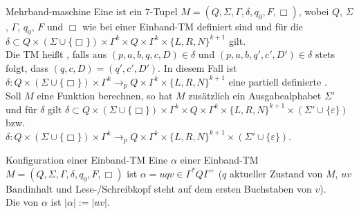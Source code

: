 \begin{Def}{Mehrband-maschine}
    Eine  ist ein $7$-Tupel
    $M = (Q, \Sigma, \Gamma, \delta, q_0, F, \Box)$, wobei
    $Q$, $\Sigma$, $\Gamma$, $q_0$, $F$ und $\Box$ wie bei einer Einband-TM definiert sind
    und für die \\
    $\delta \subset Q \times (\Sigma \cup \{\Box\}) \times \Gamma^k \times Q \times
    \Gamma^k \times \{L, R, N\}^{k+1}$ gilt.\\
    Die TM heißt , falls aus
    $(p, a, b, q, c, D) \in \delta$ und $(p, a, b, q', c', D') \in \delta$ stets folgt, dass
    $(q, c, D) = (q', c', D')$.
    In diesem Fall ist
    $\delta\colon Q \times (\Sigma \cup \{\Box\}) \times \Gamma^k \rightarrow_p Q \times
    \Gamma^k \times \{L, R, N\}^{k+1}$
    eine partiell definierte .\\
    Soll $M$ eine Funktion berechnen, so hat $M$ zusätzlich ein Ausgabealphabet $\Sigma'$
    und für $\delta$ gilt
    $\delta \subset Q \times (\Sigma \cup \{\Box\}) \times \Gamma^k \times Q \times
    \Gamma^k \times \{L, R, N\}^{k+1} \times (\Sigma' \cup \{\varepsilon\})$ bzw.\\
    $\delta\colon Q \times (\Sigma \cup \{\Box\}) \times \Gamma^k \rightarrow_p Q \times
    \Gamma^k \times \{L, R, N\}^{k+1} \times (\Sigma' \cup \{\varepsilon\})$.
\end{Def}

\linie

\begin{Def}{Konfiguration einer Einband-TM}
    Eine  $\alpha$ einer Einband-TM\\
    $M = (Q, \Sigma, \Gamma, \delta, q_0, F, \Box)$ ist
    $\alpha = uqv \in \Gamma^\ast Q \Gamma^+$
    ($q$ aktueller Zustand von $M$, $uv$ Bandinhalt und Lese-/Schreibkopf steht auf dem ersten
    Buchstaben von $v$).\\
    Die  von $\alpha$ ist $|\alpha| := |uv|$.
\end{Def}

